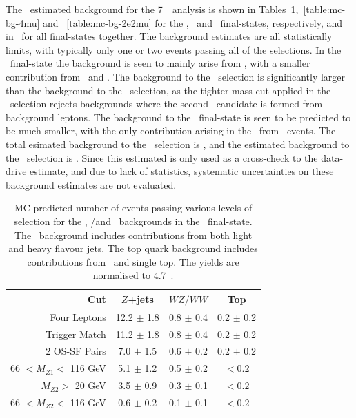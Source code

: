 The \mc\ estimated background for the 7~\tev\ analysis is shown
in Tables~\ref{table:mc-bg-4e},~\ref{table:mc-bg-4mu} and
~\ref{table:mc-bg-2e2mu} for the \eeee, \mmmm\ and \eemm\ final-states,
respectively, and in~ for all final-states together. The
background estimates are all statistically limits, with typically only one or
two events passing all of the selections. In the \eeee\ final-state the
background is seen to mainly arise from \Zjets, with a smaller contribution from
\WZ\ and \WW. The background to the \ZZs\ selection is significantly larger than
the background to the \ZZ\ selection, as the tighter mass cut applied in the
\ZZ\ selection rejects backgrounds where the second \Z\ candidate is formed from
background leptons. The background to the \mmmm\ final-state is seen to be
predicted to be much smaller, with the only contribution arising in the \mc\
from \WZ\ events. The total esimated background to the \ZZs\ selection is
\measStat{8.3}{\errSym{1.3}}, and the estimated background to the \ZZ\ selection
is \measStat{1.5}{\errSym{0.4}}. Since this estimated is only used as a
cross-check to the data-drive estimate, and due to lack of statistics,
systematic uncertainties on these background estimates are not evaluated.

\begin{table}[htbp]
  \centering
  \begin{tabular}{r|c|c|c} 
    \hline\hline
                 Cut &               $Z$+jets &             $WZ/WW$ &               Top\\ 
    \hline
        Four Leptons        &  12.2 $\pm$ 1.8 & 0.8 $\pm$ 0.4 & 0.2 $\pm$ 0.2 \\ 
       Trigger Match        &  11.2 $\pm$ 1.8 & 0.8 $\pm$ 0.4 & 0.2 $\pm$ 0.2 \\ 
       2 OS-SF Pairs        &  7.0  $\pm$ 1.5 & 0.6 $\pm$ 0.2 & 0.2 $\pm$ 0.2 \\ 
66 $ < M_{Z1} < $ 116 GeV   &  5.1  $\pm$ 1.2 & 0.5 $\pm$ 0.2 & $<0.2$ \\ 
  $M_{Z2} > $ 20 GeV        &  3.5  $\pm$ 0.9 & 0.3 $\pm$ 0.1 & $<0.2$ \\ 
66 $ < M_{Z2} < $ 116 GeV   &  0.6  $\pm$ 0.2 & 0.1 $\pm$ 0.1 & $<0.2$ \\ 
    \hline\hline
  \end{tabular}
  \caption[MC predicted number of events passing various levels of selection for
  the \Zjets, \WZ/\WW and \topquark\ backgrounds in the \eeee\ final-state.]
  {MC predicted number of events passing various levels of selection for
  the \Zjets, \WZ/\WW and \topquark\ backgrounds in the \eeee\ final-state. The
  \Zjets\ background includes contributions from both light and heavy flavour
  jets. The top quark background includes contributions from \ttbar\ and
  single top. The yields are normalised to 4.7~\ifb.
  }
  \label{table:mc-bg-4e}
\end{table}

